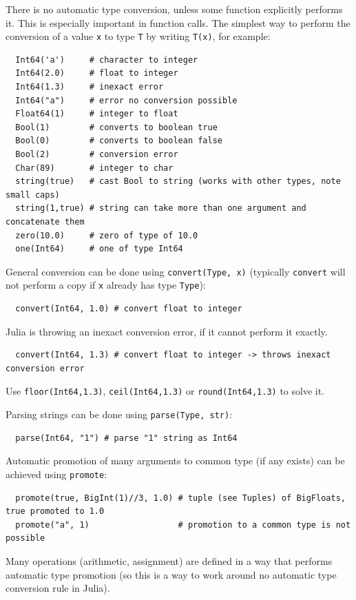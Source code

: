 \documentclass[10pt,a4paper]{article}
\begin{document}
There is no automatic type conversion, unless some function explicitly performs
it. This is especially important in function calls. The simplest way to perform
the conversion of a value \lstinline|x| to type \lstinline|T| by writing
\lstinline|T(x)|, for example:
\begin{lstlisting}
  Int64('a')     # character to integer
  Int64(2.0)     # float to integer
  Int64(1.3)     # inexact error
  Int64("a")     # error no conversion possible
  Float64(1)     # integer to float
  Bool(1)        # converts to boolean true
  Bool(0)        # converts to boolean false
  Bool(2)        # conversion error
  Char(89)       # integer to char
  string(true)   # cast Bool to string (works with other types, note small caps)
  string(1,true) # string can take more than one argument and concatenate them
  zero(10.0)     # zero of type of 10.0
  one(Int64)     # one of type Int64
\end{lstlisting}
General conversion can be done using \lstinline|convert(Type, x)| (typically
\lstinline|convert| will not perform a copy if \lstinline|x| already has type
\lstinline|Type|):
\begin{lstlisting}
  convert(Int64, 1.0) # convert float to integer
\end{lstlisting}
Julia is throwing an inexact conversion error, if it cannot perform it exactly.
\begin{lstlisting}
  convert(Int64, 1.3) # convert float to integer -> throws inexact conversion error
\end{lstlisting}
Use \lstinline|floor(Int64,1.3)|, \lstinline|ceil(Int64,1.3)| or \lstinline|round(Int64,1.3)| to solve it.

Parsing strings can be done using \lstinline|parse(Type, str)|:
\begin{lstlisting}
  parse(Int64, "1") # parse "1" string as Int64
\end{lstlisting}
Automatic promotion of many arguments to common type (if any exists) can be
achieved using \lstinline|promote|:
\begin{lstlisting}
  promote(true, BigInt(1)//3, 1.0) # tuple (see Tuples) of BigFloats, true promoted to 1.0
  promote("a", 1)                  # promotion to a common type is not possible
\end{lstlisting}
Many operations (arithmetic, assignment) are defined in a way that performs
automatic type promotion (so this is a way to work around no automatic type
conversion rule in Julia).
\end{document}
